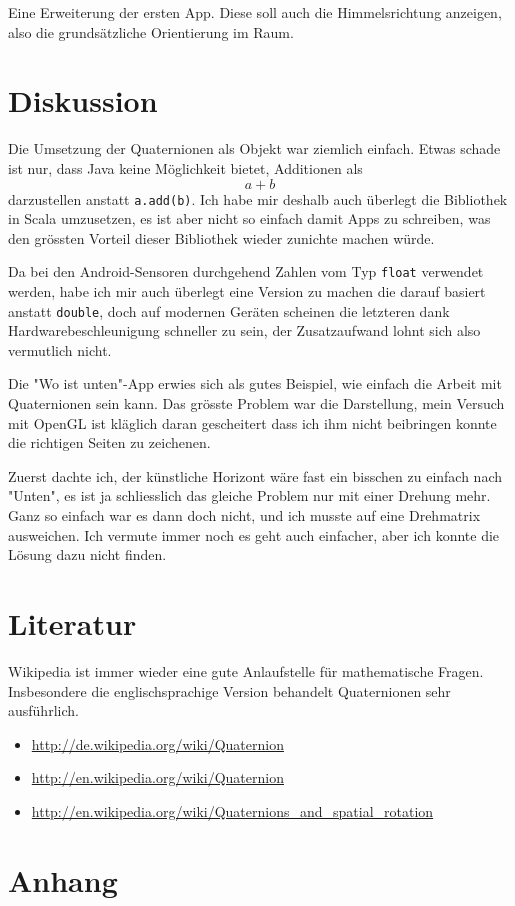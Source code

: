 \documentclass[12pt]{article}
\begin{document}
  Eine Erweiterung der ersten App. Diese soll auch die Himmelsrichtung anzeigen, also die grundsätzliche Orientierung im Raum.


  \section{Diskussion}

  Die Umsetzung der Quaternionen als Objekt war ziemlich einfach. Etwas schade ist nur, dass Java keine Möglichkeit bietet, Additionen als $$a + b$$ darzustellen anstatt \texttt{a.add(b)}. Ich habe mir deshalb auch überlegt die Bibliothek in Scala umzusetzen, es ist aber nicht so einfach damit Apps zu schreiben, was den grössten Vorteil dieser Bibliothek wieder zunichte machen würde.

  Da bei den Android-Sensoren durchgehend Zahlen vom Typ \texttt{float} verwendet werden, habe ich mir auch überlegt eine Version zu machen die darauf basiert anstatt \texttt{double}, doch auf modernen Geräten scheinen die letzteren dank Hardwarebeschleunigung schneller zu sein, der Zusatzaufwand lohnt sich also vermutlich nicht.

  Die "Wo ist unten"-App erwies sich als gutes Beispiel, wie einfach die Arbeit mit Quaternionen sein kann. Das grösste Problem war die Darstellung, mein Versuch mit OpenGL ist kläglich daran gescheitert dass ich ihm nicht beibringen konnte die richtigen Seiten zu zeichenen.

  Zuerst dachte ich, der künstliche Horizont wäre fast ein bisschen zu einfach nach "Unten", es ist ja schliesslich das gleiche Problem nur mit einer Drehung mehr. Ganz so einfach war es dann doch nicht, und ich musste auf eine Drehmatrix ausweichen. Ich vermute immer noch es geht auch einfacher, aber ich konnte die Lösung dazu nicht finden.


  \section{Literatur}

  Wikipedia ist immer wieder eine gute Anlaufstelle für mathematische Fragen. Insbesondere die englischsprachige Version behandelt Quaternionen sehr ausführlich.

  \begin{itemize}
    \item \url{http://de.wikipedia.org/wiki/Quaternion}
    \item \url{http://en.wikipedia.org/wiki/Quaternion}
    \item \url{http://en.wikipedia.org/wiki/Quaternions_and_spatial_rotation}
  \end{itemize}

  \section{Anhang}
\end{document}
